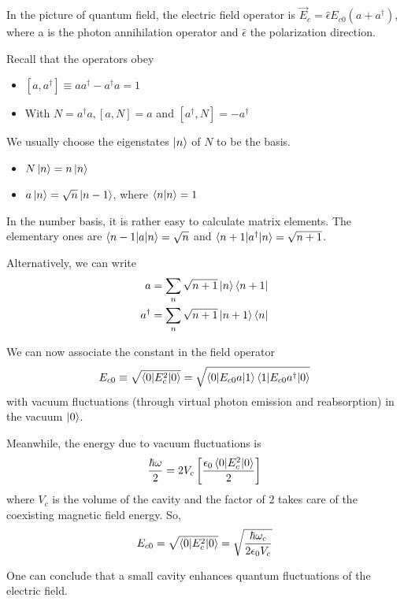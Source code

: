 In the picture of quantum field, the electric field operator is $\vec{E}_c=\hat{\epsilon}E_{c0}(a+a^\dagger)$, where a is the photon annihilation operator and $\hat{\epsilon}$ the polarization direction.

Recall that the operators obey
\begin{itemize}\small
    \item $[a, a^\dagger]\equiv aa^\dagger -a^\dagger a=1$
    \item With $N=a^\dagger a, [a, N]=a$ and $[a^\dagger, N]=-a^\dagger$
\end{itemize}

We usually choose the eigenstates $\ket{n}$ of $N$ to be the basis.
\begin{itemize}\small
    \item $N\ket{n}=n\ket{n}$
    \item $a\ket{n}=\sqrt{n}\ket{n-1}$, where $\braket{n|n}=1$
\end{itemize}

In the number basis, it is rather easy to calculate matrix elements. The elementary ones are $\braket{n-1|a|n}=\sqrt{n}$ and $\braket{n+1|a^\dagger |n}=\sqrt{n+1}$. 

Alternatively, we can write
\begin{align*}
    a&= \sum_n\sqrt{n+1}\ket{n}\bra{n+1} \\
    a^\dagger &= \sum_n \sqrt{n+1}\ket{n+1}\bra{n}
\end{align*}

We can now associate the constant in the field operator
\begin{align*}
    E_{c0}\equiv \sqrt{\braket{0|E_c^2|0}}=\sqrt{\braket{0|E_{c0}a|1}\braket{1|E_{c0}a^\dagger|0}}
\end{align*}
with vacuum fluctuations (through virtual photon emission and reabsorption) in the vacuum $\ket{0}$. 

Meanwhile, the energy due to vacuum fluctuations is
\begin{align*}
    \frac{\hbar\omega}{2}=2V_c\left[ \frac{\epsilon_0\braket{0|E_c^2|0}}{2} \right]
\end{align*}
where $V_c$ is the volume of the cavity and the factor of 2 takes care of the coexisting magnetic field energy. So,
\begin{align*}
    E_{c0}=\sqrt{\braket{0|E_c^2|0}}=\sqrt{\frac{\hbar\omega_c}{2\epsilon_0 V_c}}
\end{align*}

One can conclude that a small cavity enhances quantum fluctuations of the electric field. 

